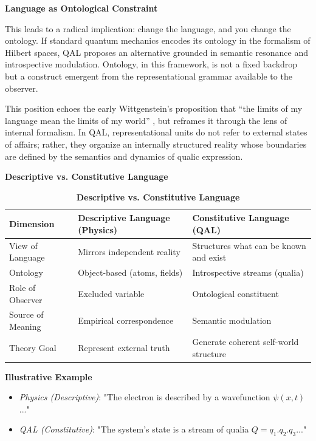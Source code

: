 \documentclass[11pt]{article}
\numberwithin{equation}{section} %
\begin{document}
\noindent\textbf{Language as Ontological Constraint}

This leads to a radical implication: change the language, and you change the ontology. If standard quantum mechanics encodes its ontology in the formalism of Hilbert spaces, QAL proposes an alternative grounded in semantic resonance and introspective modulation. Ontology, in this framework, is not a fixed backdrop but a construct emergent from the representational grammar available to the observer.

This position echoes the early Wittgenstein’s proposition that “the limits of my language mean the limits of my world” \cite{wittgenstein1922tractatus}, but reframes it through the lens of internal formalism. In QAL, representational units do not refer to external states of affairs; rather, they organize an internally structured reality whose boundaries are defined by the semantics and dynamics of qualic expression.

\bigskip

\noindent\textbf{Descriptive vs. Constitutive Language}

\begin{table}[ht]
\centering
\renewcommand{\arraystretch}{1.2}
\begin{tabular}{|p{4cm}|p{5cm}|p{5cm}|}
\hline
\textbf{Dimension} & \textbf{Descriptive Language (Physics)} & \textbf{Constitutive Language (QAL)} \\
\hline
View of Language & Mirrors independent reality & Structures what can be known and exist \\
\hline
Ontology & Object-based (atoms, fields) & Introspective streams (qualia) \\
\hline
Role of Observer & Excluded variable & Ontological constituent \\
\hline
Source of Meaning & Empirical correspondence & Semantic modulation \\
\hline
Theory Goal & Represent external truth & Generate coherent self-world structure \\
\hline
\end{tabular}
\caption*{\textbf{Descriptive vs. Constitutive Language}}
\end{table}


\bigskip

\noindent\textbf{Illustrative Example}

\begin{itemize}
\item \textit{Physics (Descriptive)}: "The electron is described by a wavefunction $\psi(x,t)$..."
\item \textit{QAL (Constitutive)}: "The system's state is a stream of qualia $Q = q_1 . q_2 . q_3$..."
\end{itemize}
\end{document}

